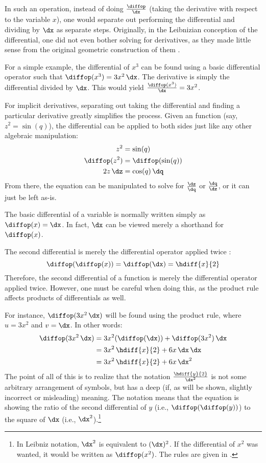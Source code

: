 In such an operation, instead of doing $\frac{\diffop}{\dx}$ (taking the derivative with respect to the variable $x$), one would separate out performing the differential and dividing by $\dx$ as separate steps.
Originally, in the Leibnizian conception of the differential, one did not even bother solving for derivatives, as they made little sense from the original geometric construction of them \citep[pgs.~8,~59]{bos1974}.

For a simple example, the differential of $x^3$ can be found using a basic differential operator such that $\diffop(x^3) = 3x^2\,\dx$.
The derivative is simply the differential divided by $\dx$.  
This would yield $\frac{\diffop(x^3)}{\dx} = 3x^2$.

For implicit derivatives, separating out taking the differential and finding a particular derivative greatly simplifies the process.
Given an function (say, $z^2 = \sin(q)$), the differential can be applied to both sides just like any other algebraic manipulation:
\begin{align*}
z^2 &= \sin(q) \\
\diffop(z^2) &= \diffop(\sin(q)) \\
2z\,\dz &= \cos(q)\,\dq
\end{align*}
From there, the equation can be manipulated to solve for $\frac{\dz}{\dq}$ or $\frac{\dq}{\dz}$, or it can just be left as-is.

The basic differential of a variable is normally written simply as $\diffop(x) = \dx$.
In fact, $\dx$ can be viewed merely a shorthand for $\diffop(x)$.

The second differential is merely the differential operator applied twice \citep[pg.~17]{bos1974}:
\begin{equation}
\diffop(\diffop(x)) = \diffop(\dx) = \hdiff{x}{2}
\end{equation}
Therefore, the second differential of a function is merely the differential operator applied twice.
However, one must be careful when doing this, as the product rule affects products of differentials as well.

For instance, $\diffop(3x^2\,\dx)$ will be found using the product rule, where $u = 3x^2$ and $v = \dx$.
In other words:
\begin{align*}
\diffop(3x^2\,\dx) &= 3x^2(\diffop(\dx)) + \diffop(3x^2)\,\dx \\
                 &= 3x^2\,\hdiff{x}{2} + 6x\,\dx\,\dx \\
                 &= 3x^2\,\hdiff{x}{2} + 6x\,\dx^2
\end{align*}
The point of all of this is to realize that the notation $\frac{\hdiff{y}{2}}{\dx^2}$ is not some arbitrary arrangement of symbols, but has a deep (if, as will be shown, slightly incorrect or misleading) meaning.
The notation means that the equation is showing the ratio of the second differential of $y$ (i.e., $\diffop(\diffop(y))$) to the square of $\dx$ (i.e., $\dx^2$).\footnote{
In Leibniz notation, $\dx^2$ is equivalent to $(\dx)^2$.  If the differential of $x^2$ was wanted, it would be written as $\diffop(x^2)$.  The rules are given in \citep[pg.~24]{bos1974}.}


